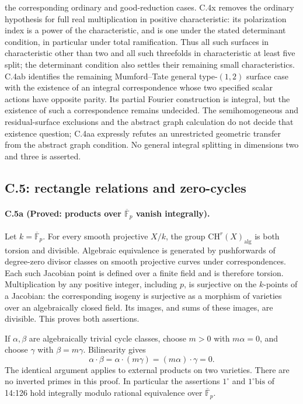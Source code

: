 the corresponding ordinary and good-reduction cases.
C.4x removes the ordinary hypothesis for full real multiplication
in positive characteristic: its polarization index is a power
of the characteristic, and is one under the stated determinant
condition, in particular under total ramification. Thus all such
surfaces in characteristic other than two and all such threefolds
in characteristic at least five split; the determinant condition
also settles their remaining small characteristics.
C.4ab identifies the remaining Mumford--Tate general
type-$(1,2)$ surface case with the existence of an integral
correspondence whose two specified scalar actions have
opposite parity. Its partial Fourier construction is integral,
but the existence of such a correspondence remains undecided.
The semihomogeneous and residual-surface exclusions and the
abstract graph calculation do not decide that existence question;
C.4aa expressly refutes an unrestricted geometric transfer
from the abstract graph condition.
No general integral splitting in dimensions two and three is
asserted.

\subsection{C.5: rectangle relations and zero-cycles}

\paragraph{C.5a (Proved: products over $\overline{\mathbb F}_p$ vanish integrally).}
Let $k=\overline{\mathbb F}_p$. For every smooth projective $X/k$,
the group $\mathrm{CH}^r(X)_{\mathrm{alg}}$ is both torsion and
divisible. Algebraic equivalence is generated by pushforwards of
degree-zero divisor classes on smooth projective curves under
correspondences. Each such Jacobian point is defined over a finite
field and is therefore torsion. Multiplication by any positive
integer, including $p$, is surjective on the $k$-points of a Jacobian:
the corresponding isogeny is surjective as a morphism of varieties
over an algebraically closed field. Its images, and sums of these
images, are divisible. This proves both assertions.

If $\alpha,\beta$ are algebraically trivial cycle classes, choose
$m>0$ with $m\alpha=0$, and choose $\gamma$ with $\beta=m\gamma$.
Bilinearity gives
\[
 \alpha\cdot\beta=\alpha\cdot(m\gamma)=(m\alpha)\cdot\gamma=0.
\]
The identical argument applies to external products on two varieties.
There are no inverted primes in this proof. In particular the
assertions $1^\circ$ and $1^\circ\mathrm{bis}$ of 14:126 hold integrally
modulo rational equivalence over $\overline{\mathbb F}_p$.

